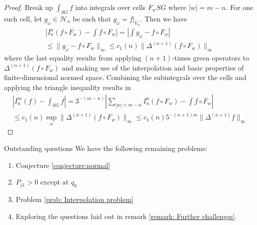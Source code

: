 \documentclass[12pt]{amsart}
\theoremstyle{plain}
\theoremstyle{definition}
\begin{document}
\begin{proof}
Break up $\int_{SG}f$ into integrals over cells $F_wSG$ where $|w| = m-n$. For one such cell, let $g_\omega\in \mathcal{H}_n$ be such that $g_\omega = f\big\rvert_{V_n}$. Then we have
\begin{align}
    \left|I_n^n(f\circ F_w) - \int f\circ F_w\right| =  \left|\int g_\omega - f\circ F_w\right|\\ \leq \|g_\omega - f\circ F_w\|_\infty \leq c_1(n)\|\Delta^{(n+1)}(f\circ F_w)\|_\infty
\end{align}
where the last equality results from applying $(n+1)$-times green operators to $\Delta^{(n+1)}(f\circ F_w)$ and making use of the interpolation and basic properties of finite-dimensional normed space. Combining the subintegrals over the cells and applying the triangle inequality results in
\begin{align}
     \left|I_n^m(f) - \int_{SG}f\right| = 3^{-(m-n)} \left|\sum\limits_{|w| = m-n} I_n^n(f\circ F_w) - \int f\circ F_w\right|\\
     \leq c_1(n)\sup\limits_\omega\|\Delta^{(n+1)}(f\circ F_w)\|_\infty \leq c_1(n)5^{-(n+1)m}\|\Delta^{(n+1)}f\|_\infty
\end{align}

\end{proof}


\begin{section}{Outstanding questions}
We have the following remaining problems: 
\begin{enumerate}
    \item Conjecture \ref{conjecture:normal}
    \item $P_{j1} > 0$ except at $q_0$
    \item Problem \ref{prob: Interpolation problem}
    \item Exploring the questions laid out in remark \ref{remark: Further challenges}. 
\end{enumerate}
\end{section}

\printbibliography
\end{document}

